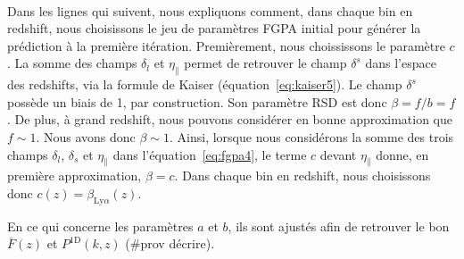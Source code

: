 \documentclass[11pt, twoside, a4paper, openright]{report}
\begin{document}
\paragraph{}
Dans les lignes qui suivent, nous expliquons comment, dans chaque bin en redshift, nous choisissons le jeu de paramètres FGPA initial pour générer la prédiction à la première itération.
Premièrement, nous choississons le paramètre $c$. La somme des champs $\delta_l$ et $\eta_{\parallel}$ permet de retrouver le champ $\delta^s$ dans l'espace des redshifts, via la formule de Kaiser (équation~\ref{eq:kaiser5}). Le champ $\delta^s$ possède un biais de 1, par construction. Son paramètre RSD est donc $\beta = f / b = f$. De plus, à grand redshift, nous pouvons considérer en bonne approximation que $f \sim 1$. Nous avons donc $\beta \sim 1$. Ainsi, lorsque nous considérons la somme des trois champs $\delta_l$, $\delta_s$ et $\eta_{\parallel}$ dans l'équation~\ref{eq:fgpa4}, le terme $c$ devant $\eta_{\parallel}$ donne, en première approximation, $\beta = c$.
Dans chaque bin en redshift, nous choisissons donc $c(z) = \beta_{\mathrm{Ly}\alpha}(z)$.

En ce qui concerne les paramètres $a$ et $b$, ils sont ajustés afin de retrouver le bon $\overline F(z)$ et $P^{\mathrm{1D}}(k, z)$ (\#prov décrire).
\end{document}
